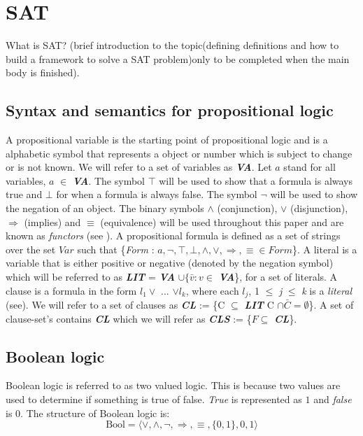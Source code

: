 \documentclass[11pt,a4paper]{report}
\begin{document}
\section{SAT}
\label{sec:SAT}

What is SAT? (brief introduction to the topic(defining definitions and how to build a framework to solve a SAT problem)only to be completed when the main body is finished).

\subsection{Syntax and semantics for propositional logic}
\label{sec:syntaxsem}

A propositional variable is the starting point of propositional logic and is a alphabetic symbol that represents a object or number which is subject to change or is not known. We will refer to a set of variables as \textit{\textbf{VA}}. Let $a$ stand for all variables, $a$ $\in$ \textit{\textbf{VA}}. The symbol $\top$ will be used to show that a formula is always true and $\bot$ for when a formula is always false. The symbol $\neg$ will be used to show the negation of an object. The binary symbols $\land$ (conjunction), $\lor$ (disjunction), $\Rightarrow$ (implies) and $\equiv$ (equivalence) will be used throughout this paper and are known as \textit{functors} (see \cite{Marek2009Introduction}). A propositional formula is defined as a set of strings over the set $Var$ such that \{\textit{Form} : $a, \neg, \top, \bot, \land, \lor, \Rightarrow, \equiv \in Form$\}. A literal is a variable that is either positive or negative (denoted by the negation symbol) which will be referred to as \textbf{\textit{LIT}} =  \textit{\textbf{VA}} $\cup \{ \bar{v} : v \in$ \textbf{\textit{VA}}\}, for a set of literals. A clause is a formula in the form $l_1 \lor$ ... $\lor l_k$, where each $l_j$, 1 $\le$ \textit{j} $\le$ \textit{k} is a \textit{literal} (see\cite{Marek2009Introduction}). We will refer to a set of clauses as \textbf{\textit{CL}} := \{C $\subseteq$ \textbf{\textit{LIT}} C $\cap \bar{C} = \emptyset$\}. A set of clause-set's contains \textbf{\textit{CL}} which we will refer as \textbf{\textit{CLS}} := \{$F \subseteq$ \textit{\textbf{CL}}\}.

\subsection{Boolean logic}
\label{sec:bool}

Boolean logic is referred to as two valued logic. This is because two values are used to determine if something is true of false. \emph{True} is represented as $1$ and \emph{false} is $0$. The structure of Boolean logic is:
\begin{displaymath}
\text{Bool} = \langle \lor, \land, \neg, \Rightarrow, \equiv,\{0,1\}, 0, 1 \rangle
\end{displaymath}
\end{document}

